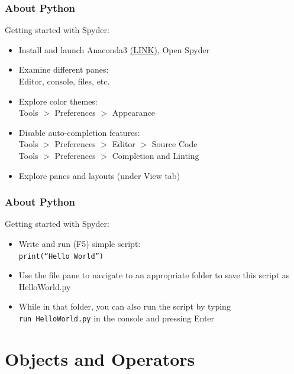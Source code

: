 \documentclass{beamer}
\newcommand{\code}[1]{\texttt{#1}}
\begin{document}
\begin{frame}%
	\frametitle{About Python}
	
	\vspace{-7pt}
	
	\begin{block}{Getting started with Spyder:}
			\begin{itemize}
				\item Install and launch Anaconda3 \href{https://www.anaconda.com/}{(LINK)}, Open Spyder
				\item Examine different panes: \\
						Editor, console, files, etc.
				\item Explore color themes: \\
						Tools $>$ Preferences $>$ Appearance
				\item Disable auto-completion features: \\
						Tools $>$ Preferences $>$ Editor $>$ Source Code \\
						Tools $>$ Preferences $>$ Completion and Linting
				\item Explore panes and layouts (under View tab)
			\end{itemize}
	\end{block}
	
\end{frame}

\begin{frame}%
	\frametitle{About Python}
	
	\vspace{-7pt}
	
	\begin{block}{Getting started with Spyder:}
			\begin{itemize}
				\item Write and run (F5) simple script: \\
						\code{print(``Hello World'')}
				\item Use the file pane to navigate to an appropriate folder to save this script as HelloWorld.py
				\item While in that folder, you can also run the script by typing \\
				\code{run HelloWorld.py} in the console and pressing Enter
			\end{itemize}
	\end{block}
	
\end{frame}


\section{Objects and Operators}
\end{document}
